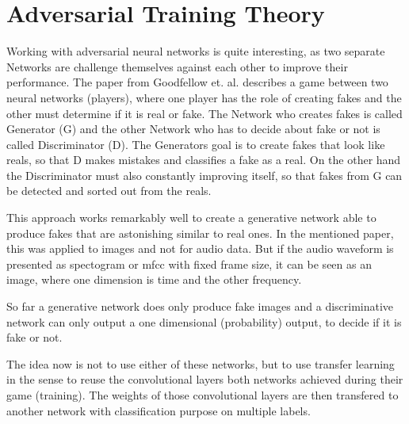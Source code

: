 
\section{Adversarial Training Theory}\label{sec:nn_adv}
\thesisStateNotReady
Working with adversarial neural networks is quite interesting, as two separate Networks are challenge themselves against each other to improve their performance.
The paper from Goodfellow et. al. \cite{Goodfellow2014} describes a game between two neural networks (players), where one player has the role of creating fakes and the other must determine if it is real or fake.
The Network who creates fakes is called Generator (G) and the other Network who has to decide about fake or not is called Discriminator (D).
The Generators goal is to create fakes that look like reals, so that D makes mistakes and classifies a fake as a real.
On the other hand the Discriminator must also constantly improving itself, so that fakes from G can be detected and sorted out from the reals.

This approach works remarkably well to create a generative network able to produce fakes that are astonishing similar to real ones.
In the mentioned paper, this was applied to images and not for audio data.
But if the audio waveform is presented as spectogram or mfcc with fixed frame size, it can be seen as an image, where one dimension is time and the other frequency.

So far a generative network does only produce fake images and a discriminative network can only output a one dimensional (probability) output, to decide if it is fake or not.

The idea now is not to use either of these networks, but to use transfer learning in the sense to reuse the convolutional layers both networks achieved during their game (training).
The weights of those convolutional layers are then transfered to another network with classification purpose on multiple labels.

